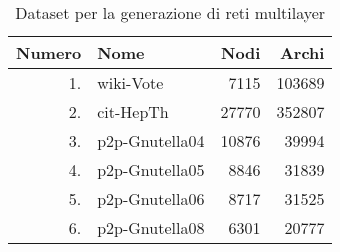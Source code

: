 \begin{table}
    \caption{Dataset per la generazione di reti multilayer}
    \label{tab:multilayer}
    \centering
    \begin{tabular}{rlrr}
        \toprule
            Numero & Nome & Nodi & Archi \\
        \midrule
        1. & wiki-Vote & \num{7115} & \num{103689} \\
        2. & cit-HepTh & \num{27770} & \num{352807} \\
        3. & p2p-Gnutella04 & \num{10876} &  \num{39994} \\ 
        4. & p2p-Gnutella05  & \num{8846} & \num{31839} \\ 
        5. & p2p-Gnutella06  & \num{8717} & \num{31525} \\ 
        6. & p2p-Gnutella08 & \num{6301} & \num{20777} \\
        \bottomrule
    \end{tabular}
%         
\end{table}